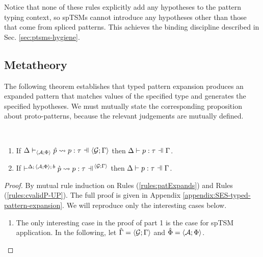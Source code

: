 {{{{Notice that none of these rules explicitly add any hypotheses to the pattern typing context, so spTSMs cannot introduce any hypotheses other than those that come from spliced patterns. This achieves the binding discipline described in Sec. \ref{sec:ptsms-hygiene}.

\subsection{Metatheory}
The following theorem establishes that typed pattern expansion produces an expanded pattern that matches values of the specified type and generates the specified hypotheses. We must mutually state the corresponding proposition about proto-patterns, because the relevant judgements are mutually defined.
\begingroup
\def\thetheorem{\ref{thm:typed-pattern-expansion}}
\begin{theorem} ~
\begin{enumerate}
  \item If $\patExpands{\uGG{\uG}{\pctx}}{\uAP{\uA}{\Phi}}{\upv}{p}{\tau}$ then $\patType{\pctx}{p}{\tau}$.
  \item If $\cvalidP{\uGG{\uG}{\pctx}}{\pscene{\Delta}{\uAP{\uA}{\Phi}}{b}}{\cpv}{p}{\tau}$ then $\patType{\pctx}{p}{\tau}$.
\end{enumerate}
\end{theorem}
\begin{proof}
  By mutual rule induction on Rules (\ref{rules:patExpands}) and Rules (\ref{rules:cvalidP-UP}). The full proof is given in Appendix \ref{appendix:SES-typed-pattern-expansion}. We will reproduce only the interesting cases below.
  \begin{enumerate}
  \item The only interesting case in the proof of part 1 is the case for spTSM application. In the following, let $\hat\Gamma=\langle \mathcal{G}; \Gamma \rangle$ and $\hat\Phi=\langle \mathcal{A}; \Phi \rangle$.
  \begin{byCases}

\end{byCases}
\end{enumerate}
\end{proof}}}}}

